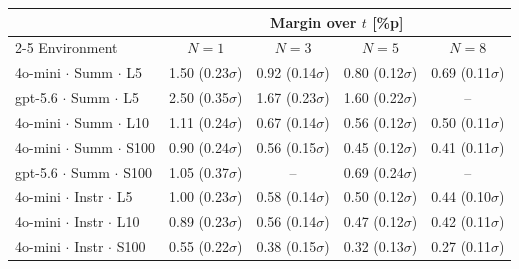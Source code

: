 \begin{tabular*}{\linewidth}{@{\extracolsep{\fill}}lcccc}
  \toprule
  & \multicolumn{4}{c}{Margin over $t$ [\%p]} \\
  \cmidrule(lr){2-5}
  Environment & $N{=}1$ & $N{=}3$ & $N{=}5$ & $N{=}8$ \\
  \midrule
  4o-mini $\cdot$ Summ $\cdot$ L5 & 1.50 (0.23$\sigma$) & 0.92 (0.14$\sigma$) & 0.80 (0.12$\sigma$) & 0.69 (0.11$\sigma$) \\  %
  gpt-5.6 $\cdot$ Summ $\cdot$ L5 & 2.50 (0.35$\sigma$) & 1.67 (0.23$\sigma$) & 1.60 (0.22$\sigma$) & -- \\  %
  4o-mini $\cdot$ Summ $\cdot$ L10 & 1.11 (0.24$\sigma$) & 0.67 (0.14$\sigma$) & 0.56 (0.12$\sigma$) & 0.50 (0.11$\sigma$) \\  %
  4o-mini $\cdot$ Summ $\cdot$ S100 & 0.90 (0.24$\sigma$) & 0.56 (0.15$\sigma$) & 0.45 (0.12$\sigma$) & 0.41 (0.11$\sigma$) \\  %
  gpt-5.6 $\cdot$ Summ $\cdot$ S100 & 1.05 (0.37$\sigma$) & -- & 0.69 (0.24$\sigma$) & -- \\  %
  4o-mini $\cdot$ Instr $\cdot$ L5 & 1.00 (0.23$\sigma$) & 0.58 (0.14$\sigma$) & 0.50 (0.12$\sigma$) & 0.44 (0.10$\sigma$) \\  %
  4o-mini $\cdot$ Instr $\cdot$ L10 & 0.89 (0.23$\sigma$) & 0.56 (0.14$\sigma$) & 0.47 (0.12$\sigma$) & 0.42 (0.11$\sigma$) \\  %
  4o-mini $\cdot$ Instr $\cdot$ S100 & 0.55 (0.22$\sigma$) & 0.38 (0.15$\sigma$) & 0.32 (0.13$\sigma$) & 0.27 (0.11$\sigma$) \\  %
  \bottomrule
\end{tabular*}
